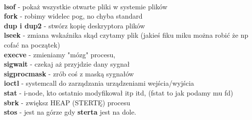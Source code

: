 \documentclass{article}
\begin{document}
\\ \textbf{lsof} - pokaż wszystkie otwarte pliki w systemie plików 
\\ \textbf{fork} - robimy widelec pog, no chyba standard
\\ \textbf{dup i dup2} - stwórz kopię deskryptora plików
\\ \textbf{lseek} - zmiana wskaźnika skąd czytamy plik (jakieś fiku miku można robić że np cofać na początek)
\\ \textbf{execve} - zmieniamy "mózg" procesu, 
\\ \textbf{sigwait} - czekaj aż przyjdzie dany sygnał
\\ \textbf{sigprocmask} - zrób coś z maską sygnałów
\\ \textbf{ioctl} - systemcall do zarządzania urządzeniami wejścia/wyjścia
\\ \textbf{stat} - i-node, kto ostatnio modyfikował itp itd, (fstat to jak podamy mu fd)
\\ \textbf{sbrk} - zwiększ HEAP (STERTĘ) procesu
\\ \textbf{stos} - jest na górze gdy \textbf{sterta} jest na dole.
\end{document}
